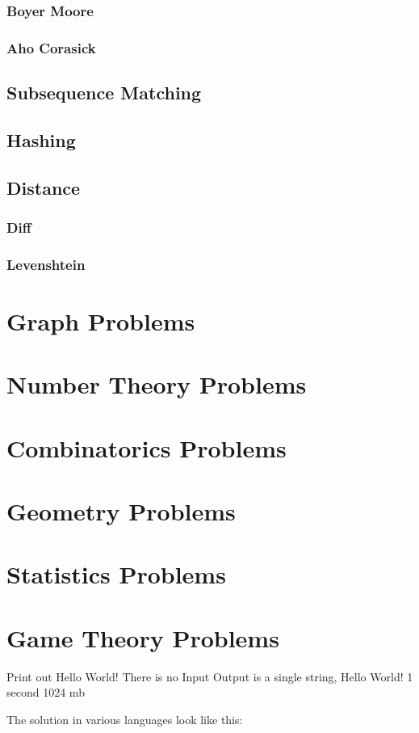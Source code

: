 \documentclass[12pt]{article}
\begin{document}
\subsubsection{Boyer Moore}
\subsubsection{Aho Corasick}
\subsection{Subsequence Matching}
\subsection{Hashing}
\subsection{Distance}
\subsubsection{Diff}
\subsubsection{Levenshtein}

\section{Graph Problems}

\section{Number Theory Problems}

\section{Combinatorics Problems}

\section{Geometry Problems}

\section{Statistics Problems}

\section{Game Theory Problems}

\pagebreak

{Print out Hello World!}
{There is no Input}
{Output is a single string, Hello World!}
{1 second}
{1024 mb}
{}

\hrulefill

The solution in various languages look like this:

\end{document}
